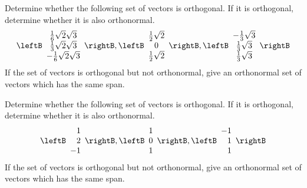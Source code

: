 \begin{enumialphparenastyle}

\begin{ex} Determine whether the following set of vectors is orthogonal. If it is
orthogonal, determine whether it is also orthonormal. 
\begin{equation*}
\leftB 
\begin{array}{c}
\frac{1}{6}\sqrt{2}\sqrt{3} \\ 
\frac{1}{3}\sqrt{2}\sqrt{3} \\ 
-\frac{1}{6}\sqrt{2}\sqrt{3}
\end{array}
\rightB ,\leftB 
\begin{array}{c}
\frac{1}{2}\sqrt{2} \\ 
0 \\ 
\frac{1}{2}\sqrt{2}
\end{array}
\rightB ,\leftB 
\begin{array}{c}
-\frac{1}{3}\sqrt{3} \\ 
\frac{1}{3}\sqrt{3} \\ 
\frac{1}{3}\sqrt{3}
\end{array}
\rightB
\end{equation*}
If the set of vectors is orthogonal but not orthonormal, give an orthonormal
set of vectors which has the same span.
\end{ex}

\begin{ex} Determine whether the following set of vectors is orthogonal. If it is
orthogonal, determine whether it is also orthonormal.
\begin{equation*}
\leftB 
\begin{array}{r}
1 \\ 
2 \\ 
-1
\end{array}
\rightB ,\leftB 
\begin{array}{c}
1 \\ 
0 \\ 
1
\end{array}
\rightB ,\leftB 
\begin{array}{r}
-1 \\ 
1 \\ 
1
\end{array}
\rightB
\end{equation*}
If the set of vectors is orthogonal but not orthonormal, give an orthonormal
set of vectors which has the same span.
\end{ex}



\end{enumialphparenastyle}
